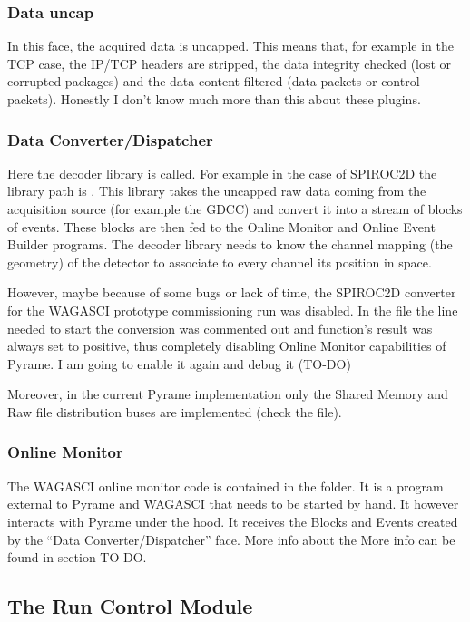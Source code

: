 \subsubsection{Data uncap}
In this face, the acquired data is uncapped. This means that, for
example in the TCP case, the IP/TCP headers are stripped, the data
integrity checked (lost or corrupted packages) and the data content
filtered (data packets or control packets). Honestly I don't know much
more than this about these plugins.

\subsubsection{Data Converter/Dispatcher}
Here the decoder library is called. For example in the case of
SPIROC2D the library path is . This
library takes the uncapped raw data coming from the acquisition source
(for example the GDCC) and convert it into a stream of blocks of
events. These blocks are then fed to the Online Monitor and Online
Event Builder programs.  The decoder library needs to know the channel
mapping (the geometry) of the detector to associate to every channel
its position in space.

However, maybe because of some bugs or lack of time, the SPIROC2D
converter for the WAGASCI prototype commissioning run was disabled. In
the  file the line needed to start the
conversion was commented out and function's result was always set to
positive, thus completely disabling Online Monitor capabilities of
Pyrame. I am going to enable it again and debug it (TO-DO)

Moreover, in the current Pyrame implementation only the Shared Memory
and Raw file distribution buses are implemented (check the
 file).

\subsubsection{Online Monitor}
The WAGASCI online monitor code is contained in the
 folder. It is a program external
to Pyrame and WAGASCI that needs to be started by hand. It however
interacts with Pyrame under the hood. It receives the Blocks and
Events created by the ``Data Converter/Dispatcher'' face. More info
about the More info can be found in section TO-DO.\@

\subsection{The Run Control Module}\label{sec:RC}

